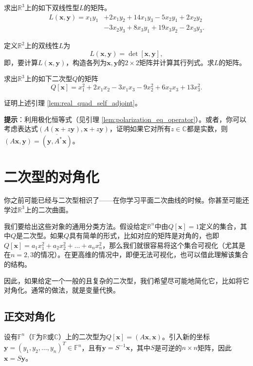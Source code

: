 \begin{problemset}
    \item 求出$\mathbb{R}^3$上的如下双线性型$L$的矩阵。
    \begin{align*}
        L(\mathbf{x},\mathbf{y})=x_1y_1&+2x_1y_2+14x_1y_3-5x_2y_1+2x_2y_2\\
        &-3x_2y_3+8x_3y_1+19x_3y_2-2x_3y_3.
    \end{align*}
    \item 定义$\mathbb{R}^2$上的双线性$L$为\[L(\mathbf{x},\mathbf{y})=\det[\mathbf{x},\mathbf{y}],\]
    即，要计算$L(\mathbf{x},\mathbf{y})$，构造各列为$\mathbf{x},\mathbf{y}$的$2\times 2$矩阵并计算其行列式。求$L$的矩阵。
    \item 求出$\mathbb{R}^3$上的如下二次型$Q$的矩阵
    \[Q[\mathbf{x}]=x_1^2+2x_1x_2-3x_1x_3-9x_2^2+6x_2x_3+13x_3^2.\]
    \item \label{ex:7_1_4} 证明上述引理 \ref{lem:real_quad_self_adjoint}。
    
    {\bf 提示}：利用极化恒等式（见引理 \ref{lem:polarization_eq_operator}）。或者，你可以考虑表达式$(A(\mathbf{x}+z\mathbf{y}),\mathbf{x}+z\mathbf{y})$，证明如果它对所有$z\in\mathbb{C}$都是实数，则$(A\mathbf{x},\mathbf{y})={\overline{(\mathbf{y},A^{*}\mathbf{x})}}$。
\end{problemset}

\section{二次型的对角化}

你之前可能已经与二次型相识了——在你学习平面二次曲线的时候。你甚至可能还学过$\mathbb{R}^3$上的二次曲面。

我们要给出这些对象的通用分类方法。假设给定$\mathbb{R}^n$中由$Q[\mathbf{x}]=1$定义的集合，其中$Q$是二次型。如果$Q$具有简单的形式，比如对应的矩阵是对角的，也即$Q[\mathbf{x}]=a_{1}x_{1}^{2}+a_{2}x_{2}^{2}+\ldots+a_{n}x_{n}^{2}$，那么我们就很容易将这个集合可视化（尤其是在$n=2,3$的情况）。在更高维的情况中，即便无法可视化，也可以借此理解该集合的结构。

因此，如果给定一个一般的且复杂的二次型，我们希望尽可能地简化它，比如将它对角化。通常的做法，就是变量代换。

\subsection{正交对角化}

设有$\mathbb{F}^n$（$\mathbb{F}$为$\mathbb{R}$或$\mathbb{C}$）上的二次型为$Q[\mathbf{x}]=(A\mathbf{x},\mathbf{x})$。引入新的坐标$\mathbf{y}=(y_{1},y_{2},\ldots,y_{n})^{T}\in\mathbb{F}^n$，且有$\mathbf{y}=S^{-1}\mathbf{x}$，其中$S$是可逆的$n\times n$矩阵，因此$\mathbf{x}=S\mathbf{y}$。

